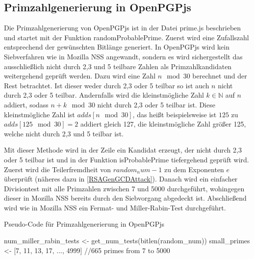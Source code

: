 \subsection{Primzahlgenerierung in OpenPGPjs}

Die Primzahlgenerierung von OpenPGPjs ist in der Datei prime.js beschrieben und startet mit der Funktion randomProbablePrime.
Zuerst wird eine Zufallszahl entsprechend der gewünschten Bitlänge generiert.
In OpenPGPjs wird kein Siebverfahren wie in Mozilla NSS angewandt, sondern es wird sichergestellt das ausschließlich nicht durch 2,3 und 5 teilbare Zahlen als Primzahlkandidaten weitergehend geprüft werden.
Dazu wird eine Zahl $n \mod 30$ berechnet und der Rest betrachtet.
Ist dieser weder durch 2,3 oder 5 teilbar so ist auch $n$ nicht durch 2,3 oder 5 teilbar.
Andernfalls wird die kleinstmögliche Zahl $k \in \mathbb{N}$ auf $n$ addiert, sodass $n + k \mod 30$ nicht durch 2,3 oder 5 teilbar ist.
Diese kleinstmögliche Zahl ist $adds[n \mod 30]$, das heißt beispielsweise ist $125$ zu $adds[125 \mod 30] = 2$ addiert gleich 127, die kleinstmögliche Zahl größer 125, welche nicht durch 2,3 und 5 teilbar ist.

Mit dieser Methode wird in der Zeile ein Kandidat erzeugt, der nicht durch 2,3 oder 5 teilbar ist und in der Funktion isProbablePrime tiefergehend geprüft wird.
Zuerst wird die Teilerfremdheit von $random_num -1$ zu dem Exponenten $e$ überprüft (näheres dazu in \ref{RSAGenGCDAttack}).
Danach wird ein einfacher Divisiontest mit alle Primzahlen zwischen 7 und 5000 durchgeführt, wohingegen dieser in Mozilla NSS bereits durch den Siebvorgang abgedeckt ist.
Abschließend wird wie in Mozilla NSS ein Fermat- und Miller-Rabin-Test durchgeführt.

\begin{algorithm}[h]
\DontPrintSemicolon
\caption{Pseudo-Code für Primzahlgenerierung in OpenPGPjs}
\label{alg:randomProbablePrimeOpenPGPjs}
num_miller_rabin_tests <- get_num_tests(bitlen(random_num))\;
small_primes <- [7, 11, 13, 17, ..., 4999] \; //665 primes from 7 to 5000\;


\end{algorithm}

